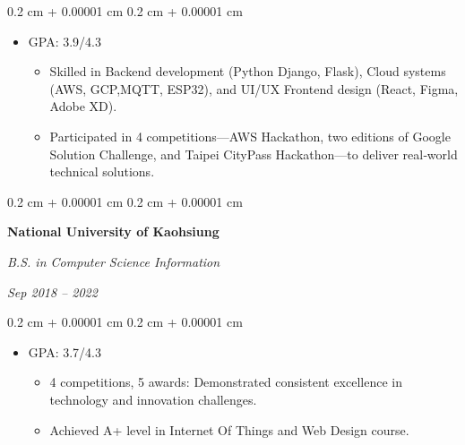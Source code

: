 \documentclass[10pt, letterpaper]{article}
\newenvironment{highlights}{
    \begin{itemize}[
        topsep=0.10 cm,
        parsep=0.10 cm,
        partopsep=0pt,
        itemsep=0pt,
        leftmargin=0.4 cm + 10pt
    ]
}{
    \end{itemize}
} %
\newenvironment{onecolentry}{
    \begin{adjustwidth}{
        0.2 cm + 0.00001 cm
    }{
        0.2 cm + 0.00001 cm
    }
}{
    \end{adjustwidth}
} %
\newenvironment{twocolentry}[2][]{
    \onecolentry
    \def\secondColumn{#2}
    \setcolumnwidth{\fill, 4.5 cm}
    \begin{paracol}{2}
}{
    \switchcolumn \raggedleft \secondColumn
    \end{paracol}
    \endonecolentry
} %
\begin{document}
        \vspace{0.10 cm}
        \begin{onecolentry}
            \begin{highlights}
                    \item GPA: 3.9/4.3
                    \begin{itemize}

                        \item Skilled in Backend development (Python Django, Flask), Cloud systems (AWS, GCP,MQTT, ESP32), and UI/UX Frontend design (React, Figma, Adobe XD).

                        \item Participated in 4 competitions—AWS Hackathon, two editions of Google Solution Challenge, and Taipei CityPass Hackathon—to deliver real‑world technical solutions.
                        \end{itemize}
              
            \end{highlights}
        \end{onecolentry}



        \begin{twocolentry}[]{
            
            
        \textit{Sep 2018 – 2022}}
            \textbf{National University of Kaohsiung}

            \textit{B.S. in Computer Science Information}
        \end{twocolentry}

        \vspace{0.10 cm}
        \begin{onecolentry}
            \begin{highlights}
                    \item GPA: 3.7/4.3
                    \begin{itemize}
                        \item 4 competitions, 5 awards: Demonstrated consistent excellence in technology and innovation challenges. \item Achieved A+ level in Internet Of Things and Web Design course. 
                     \end{itemize}
              
            \end{highlights}
        \end{onecolentry}
\end{document}
